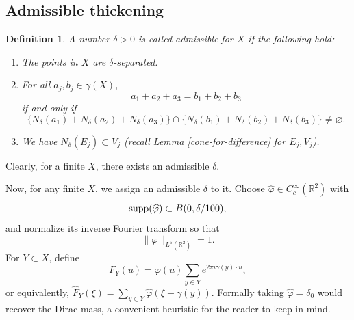 \documentclass{amsart}
\numberwithin{equation}{section}
\newtheorem{definition}[theorem]{Definition}
\newcommand{\vp}{\varphi}
\newcommand{\R}{\mathbb{R}}
\newcommand{\supp}{{\rm supp}}
\begin{document}
\medskip

\subsection{Admissible thickening}

\begin{definition}
    \label{admissible-def}
    A number $\delta>0$ is called \emph{admissible for $X$} if the following hold:
    \begin{enumerate}
        \item The points in $X$ are $\delta$-separated.
        \item For all $a_j, b_j\in \gamma(X)$, 
        \begin{equation}
            \nonumber
            a_1+a_2+a_3=b_1+b_2+b_3
        \end{equation}
        if and only if 
        \begin{equation}
            \nonumber
            \{N_\delta(a_1)+N_\delta(a_2)+N_\delta(a_3)\}\cap \{N_\delta(b_1)+N_\delta(b_2)+N_\delta(b_3)\}\not=\varnothing.
        \end{equation}
        \item 
        We have $N_\delta(E_j)\subset V_j$ (recall Lemma \ref{cone-for-difference} for $E_j,V_j$).
    \end{enumerate}
    
\end{definition}

Clearly, for a finite $X$, there exists an admissible $\delta$. 

\medskip

Now, for any finite $X$, we assign an admissible $\delta$ to it.
Choose $\widehat\vp\in C_c^\infty(\R^2)$ with
\begin{equation}
    \nonumber
    \supp(\widehat\vp)\subset B(0,\delta/100),
\end{equation}
and normalize its inverse Fourier transform so that
\begin{equation}
    \nonumber
    \|\vp\|_{L^6(\R^2)}=1.
\end{equation}
For $Y\subset X$, define
\begin{equation}
    \label{FY}
    F_Y(u)=\vp(u)\sum_{y\in Y} e^{2\pi i\gamma(y)\cdot u},
\end{equation}
or equivalently, $\widehat F_Y(\xi)=\sum_{y\in Y}\widehat\vp(\xi-\gamma(y))$.
Formally taking $\widehat{\vp}=\delta_0$ would recover the Dirac mass, a convenient heuristic for the reader to keep in mind.
\end{document}
